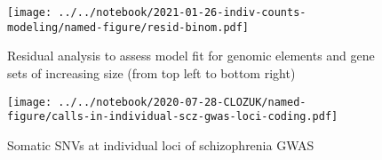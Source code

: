 \documentclass[letterpaper]{article}
\begin{document}
\begin{figure}[p]
\texttt{[image: ../../notebook/2021-01-26-indiv-counts-modeling/named-figure/resid-binom.pdf]}
\caption{
Residual analysis to assess model fit for genomic elements and gene
sets of increasing size (from top left to bottom right)
}
\label{fig:residual-QQ}
\end{figure}

\begin{figure}[p]
\texttt{[image: ../../notebook/2020-07-28-CLOZUK/named-figure/calls-in-individual-scz-gwas-loci-coding.pdf]}
\caption{
Somatic SNVs at individual loci of schizophrenia GWAS
}
\label{fig:indiv-scz-gwas-loci}
\end{figure}
\end{document}

